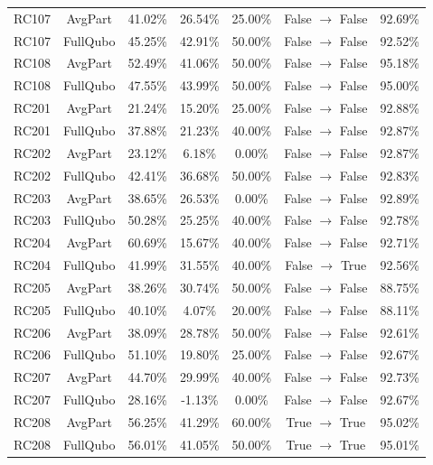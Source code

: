 \documentclass[conference]{IEEEtran}
\begin{document}
\begin{table}[htbp]
{\begin{tabular}{lcccccc}
RC107 & AvgPart & 41.02\% & 26.54\% & 25.00\% & False $\to$ False & 92.69\% \\
RC107 & FullQubo & 45.25\% & 42.91\% & 50.00\% & False $\to$ False & 92.52\% \\

RC108 & AvgPart & 52.49\% & 41.06\% & 50.00\% & False $\to$ False & 95.18\% \\
RC108 & FullQubo & 47.55\% & 43.99\% & 50.00\% & False $\to$ False & 95.00\% \\

RC201 & AvgPart & 21.24\% & 15.20\% & 25.00\% & False $\to$ False & 92.88\% \\
RC201 & FullQubo & 37.88\% & 21.23\% & 40.00\% & False $\to$ False & 92.87\% \\

RC202 & AvgPart & 23.12\% & 6.18\% & 0.00\% & False $\to$ False & 92.87\% \\
RC202 & FullQubo & 42.41\% & 36.68\% & 50.00\% & False $\to$ False & 92.83\% \\

RC203 & AvgPart & 38.65\% & 26.53\% & 0.00\% & False $\to$ False & 92.89\% \\
RC203 & FullQubo & 50.28\% & 25.25\% & 40.00\% & False $\to$ False & 92.78\% \\

RC204 & AvgPart & 60.69\% & 15.67\% & 40.00\% & False $\to$ False & 92.71\% \\
RC204 & FullQubo & 41.99\% & 31.55\% & 40.00\% & False $\to$ True & 92.56\% \\

RC205 & AvgPart & 38.26\% & 30.74\% & 50.00\% & False $\to$ False & 88.75\% \\
RC205 & FullQubo & 40.10\% & 4.07\% & 20.00\% & False $\to$ False & 88.11\% \\

RC206 & AvgPart & 38.09\% & 28.78\% & 50.00\% & False $\to$ False & 92.61\% \\
RC206 & FullQubo & 51.10\% & 19.80\% & 25.00\% & False $\to$ False & 92.67\% \\

RC207 & AvgPart & 44.70\% & 29.99\% & 40.00\% & False $\to$ False & 92.73\% \\
RC207 & FullQubo & 28.16\% & -1.13\% & 0.00\% & False $\to$ False & 92.67\% \\

RC208 & AvgPart & 56.25\% & 41.29\% & 60.00\% & True $\to$ True & 95.02\% \\
RC208 & FullQubo & 56.01\% & 41.05\% & 50.00\% & True $\to$ True & 95.01\% \\

\bottomrule
\end{tabular}%
}
\end{table}
\end{document}
